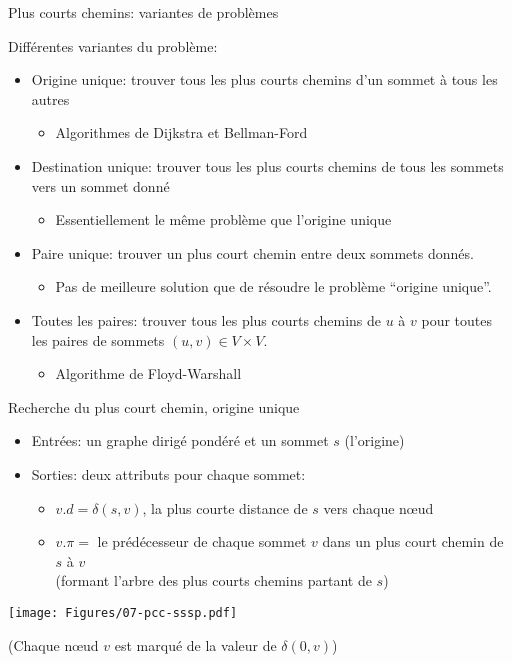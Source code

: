 \begin{frame}{Plus courts chemins: variantes de problèmes}

Différentes variantes du problème:
\begin{itemize}
\item \alert{Origine unique}: trouver tous les plus courts chemins d'un sommet à tous les autres
\begin{itemize}
\item Algorithmes de Dijkstra et Bellman-Ford
\end{itemize}
\item \alert{Destination unique}: trouver tous les plus courts chemins de tous les sommets vers un sommet donné
\begin{itemize}
\item Essentiellement le même problème que l'origine unique
\end{itemize}
\item \alert{Paire unique}: trouver un plus court chemin entre deux sommets donnés.
\begin{itemize}
\item Pas de meilleure solution que de résoudre le problème ``origine unique''.
\end{itemize}
\item \alert{Toutes les paires}: trouver tous les plus courts chemins de $u$ à
  $v$ pour toutes les paires de sommets $(u,v)\in V\times V$.
\begin{itemize}
\item Algorithme de Floyd-Warshall
\end{itemize}
\end{itemize}

\end{frame}



\begin{frame}{Recherche du plus court chemin, origine unique}

\begin{itemize}
\item Entrées: un graphe dirigé pondéré et un sommet $s$ (l'origine)
\item Sorties: deux attributs pour chaque sommet:
\begin{itemize}
\item $v.d=\delta(s,v)$, la plus courte distance de $s$ vers chaque n\oe ud
\item $v.\pi=$ le prédécesseur de chaque sommet $v$ dans un plus court chemin de $s$ à $v$\\
(formant \alert{l'arbre} des plus courts chemins partant de $s$)
\end{itemize}
\end{itemize}

\centerline{\texttt{[image: Figures/07-pcc-sssp.pdf]}}

\centerline{\small(Chaque n\oe ud $v$ est marqué de la valeur de $\delta(0,v)$)}

\end{frame}

